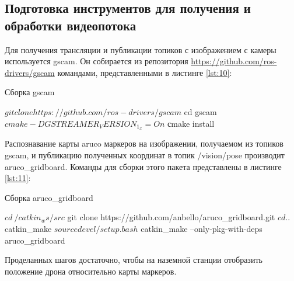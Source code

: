 \subsection{Подготовка инструментов для получения и обработки видеопотока}
Для получения трансляции и публикации топиков с изображением с камеры используется gscam. Он собирается из репозитория \url{https://github.com/ros-drivers/gscam} командами, представленными в листинге \ref{lst:10}:
\begin{Program}[H]
	\caption{Сборка gscam} \label{lst:10}
	\begin{MyCode}
	$ git clone https://github.com/ros-drivers/gscam
	$ cd gscam
	$ cmake -DGSTREAMER_VERSION_1_x=On
	$ сmake install
	\end{MyCode}
\end{Program}

Распознавание карты aruco маркеров на изображении, получаемом из топиков gscam, и публикацию полученных координат в топик /vision/pose производит aruco\_gridboard. Команды для сборки этого пакета представлены в листинге \ref{lst:11}:
\begin{Program}[H]
	\caption{Сборка aruco\_gridboard} \label{lst:11}
	\begin{MyCode}	
	$ cd ~/catkin_ws/src
	$ git clone https://github.com/anbello/aruco_gridboard.git
	$ cd ..
	$ catkin_make
	$ source devel/setup.bash
	$ catkin_make --only-pkg-with-deps aruco_gridboard
	\end{MyCode}
\end{Program}

Проделанных шагов достаточно, чтобы на наземной станции отобразить положение дрона относительно карты маркеров.
